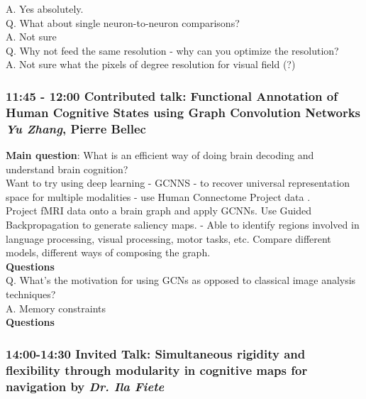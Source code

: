 \documentclass[12pt]{article}
\begin{document}
A. Yes absolutely. \\

Q. What about single neuron-to-neuron comparisons? \\

A. Not sure \\

Q. Why not feed the same resolution - why can you optimize the resolution? \\

A. Not sure what the pixels of degree resolution for visual field (?)


\subsubsection{11:45 - 12:00 Contributed talk:  Functional Annotation of Human Cognitive States using Graph Convolution Networks \textit{Yu Zhang}, Pierre Bellec}

\textbf{Main question}: What is an efficient way of doing brain decoding and understand brain cognition? \\

Want to try using deep learning - GCNNS - to recover universal representation space for multiple modalities - use Human Connectome Project data \cite{Hughes2016}. \\

Project fMRI data onto a brain graph and apply GCNNs. Use Guided Backpropagation to generate saliency maps. - Able to identify regions involved in language processing, visual processing, motor tasks, etc. Compare different models, different ways of composing the graph. \\

\textbf{Questions} \\ 

Q. What's the motivation for using GCNs as opposed to classical image analysis techniques? \\

A. Memory constraints \\

\textbf{Questions} \\


\subsubsection{14:00-14:30 Invited Talk: Simultaneous rigidity and flexibility through modularity in cognitive maps for navigation by \textit{Dr. Ila Fiete}}
\end{document}
